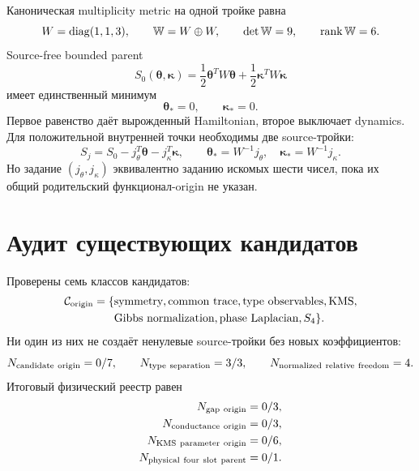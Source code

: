 Каноническая multiplicity metric на одной тройке равна
\begin{equation}
 W=\operatorname{diag}(1,1,3),
 \qquad
 \mathbb W=W\oplus W,
 \qquad \det\mathbb W=9,
 \qquad \operatorname{rank}\mathbb W=6.
 \label{eq:v9-kms-origin-common-metric}
\end{equation}
Source-free bounded parent
\begin{equation}
 S_0(\boldsymbol\theta,\boldsymbol\kappa)
 =\frac12\boldsymbol\theta^TW\boldsymbol\theta
 +\frac12\boldsymbol\kappa^TW\boldsymbol\kappa
 \label{eq:v9-kms-origin-source-free-parent}
\end{equation}
имеет единственный минимум
\begin{equation}
 \boldsymbol\theta_*=0,
 \qquad \boldsymbol\kappa_*=0.
 \label{eq:v9-kms-origin-zero-minimum}
\end{equation}
Первое равенство даёт вырожденный Hamiltonian, второе выключает dynamics.
Для положительной внутренней точки необходимы две source-тройки:
\begin{equation}
 S_j=S_0-j_\theta^T\boldsymbol\theta-j_\kappa^T\boldsymbol\kappa,
 \qquad
 \boldsymbol\theta_*=W^{-1}j_\theta,
 \quad
 \boldsymbol\kappa_*=W^{-1}j_\kappa.
 \label{eq:v9-kms-origin-sourced-parent}
\end{equation}
Но задание $(j_\theta,j_\kappa)$ эквивалентно заданию искомых шести чисел,
пока их общий родительский функционал-origin не указан.

\section{Аудит существующих кандидатов}

Проверены семь классов кандидатов:
\begin{equation}
 \begin{aligned}
 \mathcal C_{\rm origin}=\{&\text{symmetry},\text{common trace},
 \text{type observables},\text{KMS},\\
 &\text{Gibbs normalization},\text{phase Laplacian},S_4\}.
 \end{aligned}
 \label{eq:v9-kms-origin-candidate-set}
\end{equation}
Ни один из них не создаёт ненулевые source-тройки без новых коэффициентов:
\begin{equation}
 N_{\rm candidate\ origin}=0/7,
 \qquad
 N_{\rm type\ separation}=3/3,
 \qquad
 N_{\rm normalized\ relative\ freedom}=4.
 \label{eq:v9-kms-origin-candidate-ledger}
\end{equation}
Итоговый физический реестр равен
\begin{equation}
 \begin{aligned}
 N_{\rm gap\ origin}&=0/3,\\
 N_{\rm conductance\ origin}&=0/3,\\
 N_{\rm KMS\ parameter\ origin}&=0/6,\\
 N_{\rm physical\ four\ slot\ parent}&=0/1.
 \end{aligned}
 \label{eq:v9-kms-origin-final-ledger}
\end{equation}

